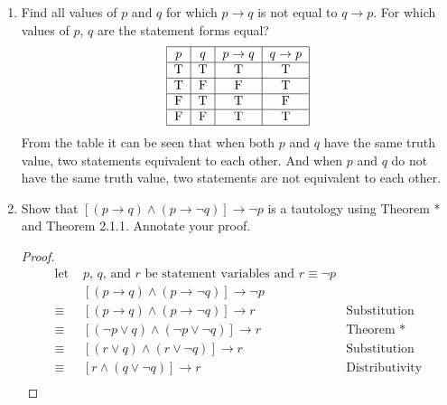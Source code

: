 \documentclass[12pt]{article}
\begin{document}
\begin{enumerate}
\begin{proof}
\begin{align*}
            \end{align*}
            \[
            \therefore (p \vee q) \rightarrow r \equiv (p \rightarrow r) \wedge (q \rightarrow r)
            \]
        \end{proof}
    \newpage
    \item Find all values of $p$ and $q$ for which $p \rightarrow q$ is not equal to $q \rightarrow p$. For which values of $p$, $q$ are the statement forms equal?\\
        \[
            \begin{tabular}{|c|c|c|c|}
            \hline
            $p$ & $q$ & $p \rightarrow q$ & $q \rightarrow p$ \\
            \hline
                 T&T&T&T  \\
            \hline
                 T&F&F&T\\
            \hline
                 F&T&T&F\\
            \hline
                 F&F&T&T \\
            \hline
            \end{tabular}
        \]
        From the table it can be seen that when both $p$ and $q$ have the same truth value, two statements equivalent to each other. And when $p$ and $q$ do not have the same truth value, two statements are not equivalent to each other.
        \newpage
    \item Show that $[(p \rightarrow q) \wedge (p \rightarrow \neg q)] \rightarrow \neg p$ is a tautology using Theorem * and Theorem 2.1.1. Annotate your proof.
        \begin{proof}
            \begin{align*}
                \text{let } & \text{$p$, $q$, and $r$ be statement variables and $r \equiv \neg p$}\\
                & [(p \rightarrow q) \wedge (p \rightarrow \neg q)] \rightarrow \neg p  \\
                \equiv &  [(p \rightarrow q) \wedge (p \rightarrow \neg q)] \rightarrow r & \text{Substitution}\\
                \equiv & [(\neg p \vee q) \wedge (\neg p \vee \neg q)] \rightarrow r & \text{Theorem *}\\
                \equiv & [(r \vee q) \wedge (r \vee \neg q)] \rightarrow r & \text{Substitution} \\
                \equiv & [ r \wedge (q \vee \neg q )] \rightarrow r & \text{Distributivity}\\

\end{align*}
\end{proof}
\end{enumerate}
\end{document}
